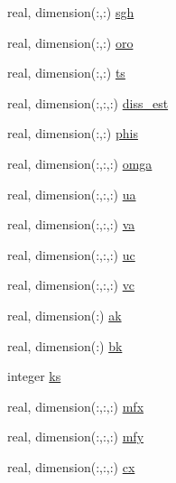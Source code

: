 \begin{DoxyCompactItemize}
\item 
real, dimension(\-:,\-:) \hyperlink{structfv__arrays__mod_1_1fv__atmos__type_ad6a036d45fbee5ca39120b204a0a78c3}{sgh}
\item 
real, dimension(\-:,\-:) \hyperlink{structfv__arrays__mod_1_1fv__atmos__type_abbfb5137f18bb1972cd59786a17e28e9}{oro}
\item 
real, dimension(\-:,\-:) \hyperlink{structfv__arrays__mod_1_1fv__atmos__type_a0b442abb8ea87c4c65eda345a9ed2fb4}{ts}
\item 
real, dimension(\-:,\-:,\-:) \hyperlink{structfv__arrays__mod_1_1fv__atmos__type_ad10ec78382b4afbe88a70499fd69c3d3}{diss\-\_\-est}
\item 
real, dimension(\-:,\-:) \hyperlink{structfv__arrays__mod_1_1fv__atmos__type_ac6cfc672780cbc8b5fab0ca13e1a7590}{phis}
\item 
real, dimension(\-:,\-:,\-:) \hyperlink{structfv__arrays__mod_1_1fv__atmos__type_a53ce006346b4f956804f3c550714cc06}{omga}
\item 
real, dimension(\-:,\-:,\-:) \hyperlink{structfv__arrays__mod_1_1fv__atmos__type_a410b5e8e5b66dc1a61c5b47aa46b2615}{ua}
\item 
real, dimension(\-:,\-:,\-:) \hyperlink{structfv__arrays__mod_1_1fv__atmos__type_a4379193f2f1d4142032c8d95c55abb0c}{va}
\item 
real, dimension(\-:,\-:,\-:) \hyperlink{structfv__arrays__mod_1_1fv__atmos__type_a672b688e0f1b1130caddd31d788d5af8}{uc}
\item 
real, dimension(\-:,\-:,\-:) \hyperlink{structfv__arrays__mod_1_1fv__atmos__type_a9f23c2d267763af4486c22466937733c}{vc}
\item 
real, dimension(\-:) \hyperlink{structfv__arrays__mod_1_1fv__atmos__type_aef6fdeb7a3c7c74773f35929a200f4e5}{ak}
\item 
real, dimension(\-:) \hyperlink{structfv__arrays__mod_1_1fv__atmos__type_a153c4671e9a6268efd9b3f1a4bae7f3c}{bk}
\item 
integer \hyperlink{structfv__arrays__mod_1_1fv__atmos__type_a737df1e4018be0a63337665e13f8f5ab}{ks}
\item 
real, dimension(\-:,\-:,\-:) \hyperlink{structfv__arrays__mod_1_1fv__atmos__type_a9bfc2bd70bc1dccfe305077daf0cab2c}{mfx}
\item 
real, dimension(\-:,\-:,\-:) \hyperlink{structfv__arrays__mod_1_1fv__atmos__type_a6f34be94d378cc6a42e4fc91617bbd40}{mfy}
\item 
real, dimension(\-:,\-:,\-:) \hyperlink{structfv__arrays__mod_1_1fv__atmos__type_a9de9d89045261a87a6708b261b6b0600}{cx}

\end{DoxyCompactItemize}
